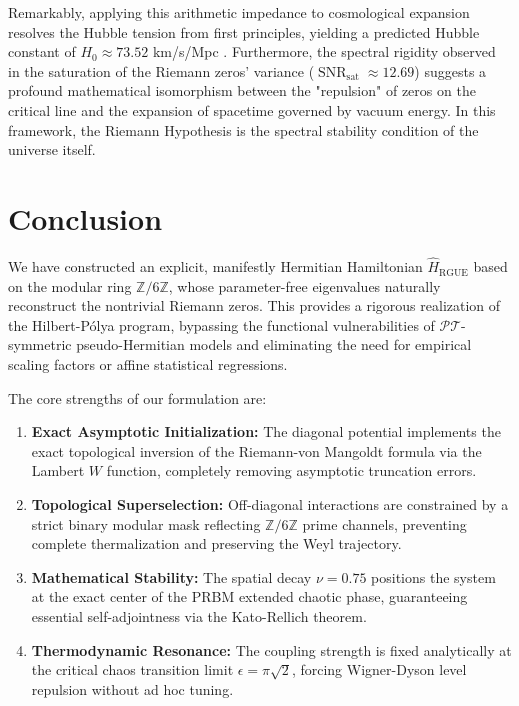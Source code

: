 \documentclass[prl,aps,floatfix,superscriptaddress,10pt]{revtex4-2}
\newcommand{\Zmod}{\mathbb{Z}/6\mathbb{Z}}
\newcommand{\SNR}{\operatorname{SNR}}
\begin{document}
Remarkably, applying this arithmetic impedance to cosmological expansion resolves the Hubble tension from first principles, yielding a predicted Hubble constant of $H_0 \approx 73.52$ km/s/Mpc \cite{PeinadorGenesis}. Furthermore, the spectral rigidity observed in the saturation of the Riemann zeros' variance ($\SNR_{\text{sat}} \approx 12.69$) suggests a profound mathematical isomorphism between the "repulsion" of zeros on the critical line and the expansion of spacetime governed by vacuum energy. In this framework, the Riemann Hypothesis is the spectral stability condition of the universe itself.

\section{Conclusion}

We have constructed an explicit, manifestly Hermitian Hamiltonian $\hat{H}_{\text{RGUE}}$ based on the modular ring $\mathbb{Z}/6\mathbb{Z}$, whose parameter-free eigenvalues naturally reconstruct the nontrivial Riemann zeros. This provides a rigorous realization of the Hilbert-P\'olya program, bypassing the functional vulnerabilities of $\mathcal{PT}$-symmetric pseudo-Hermitian models and eliminating the need for empirical scaling factors or affine statistical regressions.

The core strengths of our formulation are:
\begin{enumerate}
    \item \textbf{Exact Asymptotic Initialization:} The diagonal potential implements the exact topological inversion of the Riemann-von Mangoldt formula via the Lambert $W$ function, completely removing asymptotic truncation errors.
    \item \textbf{Topological Superselection:} Off-diagonal interactions are constrained by a strict binary modular mask reflecting $\Zmod$ prime channels, preventing complete thermalization and preserving the Weyl trajectory.
    \item \textbf{Mathematical Stability:} The spatial decay $\nu = 0.75$ positions the system at the exact center of the PRBM extended chaotic phase, guaranteeing essential self-adjointness via the Kato-Rellich theorem.
    \item \textbf{Thermodynamic Resonance:} The coupling strength is fixed analytically at the critical chaos transition limit $\epsilon = \pi \sqrt{2}$, forcing Wigner-Dyson level repulsion without ad hoc tuning.
\end{enumerate}
\end{document}
